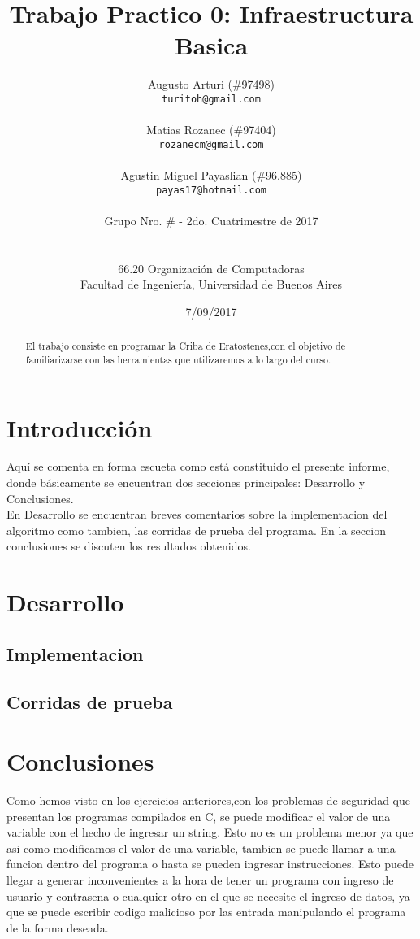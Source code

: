 \documentclass[a4paper,10pt]{article}
\title{\textbf{Trabajo Practico 0: Infraestructura Basica}}
\author{Augusto Arturi (\#97498)\\
\texttt{turitoh@gmail.com}\\
\\
Matias Rozanec (\#97404)\\            \texttt{rozanecm@gmail.com}\\
\\
Agustin Miguel Payaslian (\#96.885)\\            \texttt{payas17@hotmail.com}\\
\\
\normalsize{Grupo Nro. \# - 2do. Cuatrimestre de 2017}\\
\\
\\
\normalsize{66.20 Organización de Computadoras}\\
\normalsize{Facultad de Ingeniería, Universidad de Buenos Aires}\\
}
\date{7/09/2017}
\begin{document}
\maketitle
\thispagestyle{empty}

\newpage
\begin{abstract}

El trabajo consiste en programar la Criba de Eratostenes,con el objetivo de familiarizarse con las herramientas que utilizaremos a lo largo del curso.
\end{abstract}


\section{Introducción}
Aquí se comenta en forma escueta como está constituido el presente informe, donde  básicamente  se  encuentran  dos  secciones  principales: Desarrollo y Conclusiones.\\
En Desarrollo se encuentran breves comentarios sobre la implementacion del algoritmo como tambien, las corridas de prueba del programa. En la seccion conclusiones se discuten los resultados obtenidos.

\section{Desarrollo}

\subsection{Implementacion}

\subsection{Corridas de prueba}

\section{Conclusiones}

Como hemos visto en los ejercicios anteriores,con los problemas de seguridad que presentan los programas compilados en C, se puede modificar el valor de una variable con el hecho de ingresar un string. Esto no es un problema menor ya que asi como modificamos el valor de una variable, tambien se puede llamar a una funcion dentro del programa o hasta se pueden ingresar instrucciones. Esto puede llegar a generar inconvenientes a la hora de tener un programa con ingreso de usuario y contrasena o cualquier otro en el que se necesite el ingreso de datos, ya que se puede escribir codigo malicioso por las entrada manipulando el programa de la forma deseada.
\end{document}
